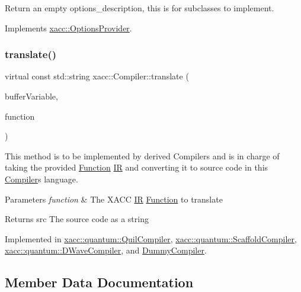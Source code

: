 Return an empty options\+\_\+description, this is for subclasses to implement. 

Implements \hyperlink{a01192_a6d150954f852109bfe2c1ae90222926f}{xacc\+::\+Options\+Provider}.

\mbox{\label{a01100_aeedbe58a33fed29e4d7694ae743e25e7}} 
\subsubsection{\texorpdfstring{translate()}{translate()}}
{\footnotesize\ttfamily virtual const std\+::string xacc\+::\+Compiler\+::translate (\begin{DoxyParamCaption}\item[{const std\+::string \&}]{buffer\+Variable,  }\item[{std\+::shared\+\_\+ptr$<$ \hyperlink{a01124}{Function} $>$}]{function }\end{DoxyParamCaption})\hspace{0.3cm}{\ttfamily [pure virtual]}}

This method is to be implemented by derived Compilers and is in charge of taking the provided \hyperlink{a01124}{Function} \hyperlink{a01148}{IR} and converting it to source code in this \hyperlink{a01100}{Compiler}\textquotesingle{}s language.


\begin{DoxyParams}{Parameters}
{\em function} & The X\+A\+CC \hyperlink{a01148}{IR} \hyperlink{a01124}{Function} to translate \\
\hline
\end{DoxyParams}
\begin{DoxyReturn}{Returns}
src The source code as a string 
\end{DoxyReturn}


Implemented in \hyperlink{a00908_a66ca00bbb1f30e7bc6dd86b1e267b93b}{xacc\+::quantum\+::\+Quil\+Compiler}, \hyperlink{a00936_ac7ca2941e987ba579c6f50cfbd7fb0dc}{xacc\+::quantum\+::\+Scaffold\+Compiler}, \hyperlink{a00948_a73a8839c55d22c68e5264feca8d626d4}{xacc\+::quantum\+::\+D\+Wave\+Compiler}, and \hyperlink{a00972_a606c27150c8d374242b8824e45b1e0c1}{Dummy\+Compiler}.



\subsection{Member Data Documentation}
\mbox{\label{a01100_ad4cbb467fa7e377bac6c054ffcb22b7c}} 

